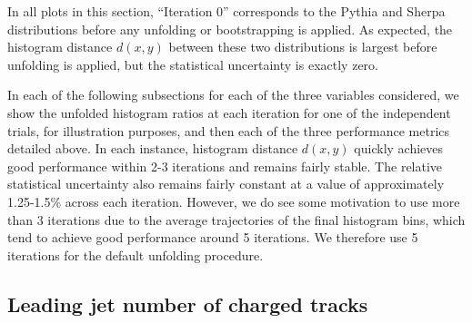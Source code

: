 In all plots in this section, ``Iteration 0'' corresponds to the Pythia and Sherpa distributions before any unfolding or bootstrapping is applied. As expected, the histogram distance $d(x,y)$ between these two distributions is largest before unfolding is applied, but the statistical uncertainty is exactly zero. 

In each of the following subsections for each of the three variables considered, we show the unfolded histogram ratios at each iteration for one of the independent trials, for illustration purposes, and then each of the three performance metrics detailed above. In each instance, histogram distance $d(x,y)$ quickly achieves good performance within 2-3 iterations and remains fairly stable. The relative statistical uncertainty also remains fairly constant at a value of approximately 1.25-1.5\% across each iteration. However, we do see some motivation to use more than 3 iterations due to the average trajectories of the final histogram bins, which tend to achieve good performance around 5 iterations. We therefore use 5 iterations for the default unfolding procedure.

\subsection{Leading jet number of charged tracks} 
